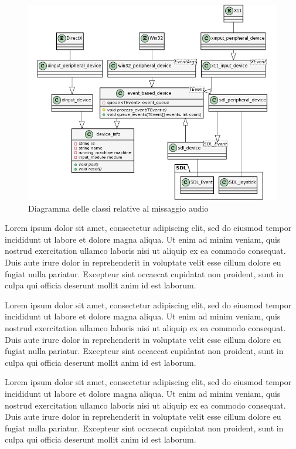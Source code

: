 \begin{figure}[H]
	\includegraphics[width=\linewidth]{immagini/class_input_device}
	\caption{Diagramma delle classi relative al missaggio audio}
	\label{fig:class_input_device}
\end{figure}

Lorem ipsum dolor sit amet, consectetur adipiscing elit, sed do eiusmod tempor incididunt ut labore et dolore magna aliqua. Ut enim ad minim veniam, quis nostrud exercitation ullamco laboris nisi ut aliquip ex ea commodo consequat. Duis aute irure dolor in reprehenderit in voluptate velit esse cillum dolore eu fugiat nulla pariatur. Excepteur sint occaecat cupidatat non proident, sunt in culpa qui officia deserunt mollit anim id est laborum.

Lorem ipsum dolor sit amet, consectetur adipiscing elit, sed do eiusmod tempor incididunt ut labore et dolore magna aliqua. Ut enim ad minim veniam, quis nostrud exercitation ullamco laboris nisi ut aliquip ex ea commodo consequat. Duis aute irure dolor in reprehenderit in voluptate velit esse cillum dolore eu fugiat nulla pariatur. Excepteur sint occaecat cupidatat non proident, sunt in culpa qui officia deserunt mollit anim id est laborum.

Lorem ipsum dolor sit amet, consectetur adipiscing elit, sed do eiusmod tempor incididunt ut labore et dolore magna aliqua. Ut enim ad minim veniam, quis nostrud exercitation ullamco laboris nisi ut aliquip ex ea commodo consequat. Duis aute irure dolor in reprehenderit in voluptate velit esse cillum dolore eu fugiat nulla pariatur. Excepteur sint occaecat cupidatat non proident, sunt in culpa qui officia deserunt mollit anim id est laborum.

